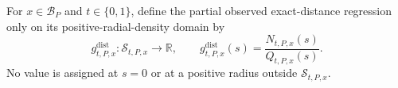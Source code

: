 For \(x\in\mathcal B_P\) and \(t\in\{0,1\}\), define the partial
observed exact-distance regression only on its positive-radial-density domain by
\[
 g^{\mathrm{dist}}_{t,P,x}:\mathcal S_{t,P,x}\to\mathbb R,
 \qquad
 g^{\mathrm{dist}}_{t,P,x}(s)=\frac{N_{t,P,x}(s)}{Q_{t,P,x}(s)}.
\]
No value is assigned at \(s=0\) or at a positive radius outside
\(\mathcal S_{t,P,x}\).